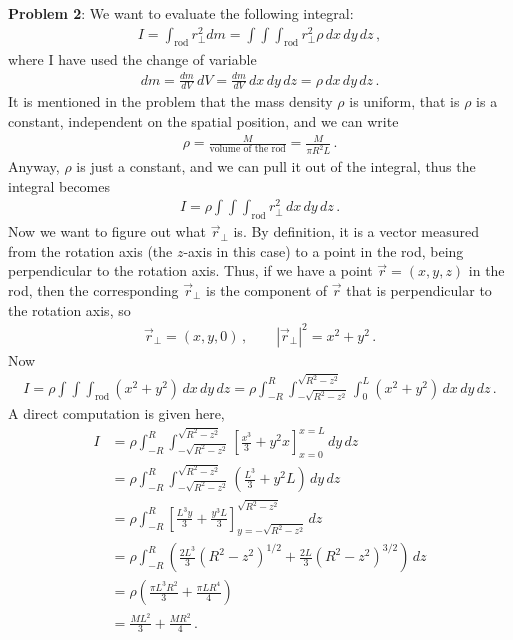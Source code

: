 \documentclass[11pt]{article}
\begin{document}
\textbf{Problem 2}: We want to evaluate the following integral:
\begin{align*}
I = \int_{\text{rod}} r_{\perp}^2 dm = 
\int\int\int_{\text{rod}} r_{\perp}^2 \rho \, dx\, dy\, dz\,,
\end{align*}
where I have used the change of variable
\begin{align*}
dm = \frac{dm}{dV} \, dV = \frac{dm}{dV} \, dx\, dy\, dz = \rho \, dx\, dy\, dz\,.
\end{align*}
It is mentioned in the problem that the mass density $\rho$ is uniform, that is $\rho$ is a constant, independent on the spatial position, and we can write
\begin{align*}
\rho = \frac{M}{\text{volume of the rod}}= \frac{M}{\pi R^2 L}\,.
\end{align*}
Anyway, $\rho$ is just a constant, and we can pull it out of the integral, thus the integral becomes
\begin{align*}
I = \rho \int \int \int_{\text{rod}} r_{\perp}^2 \, dx\, dy\, dz\,.
\end{align*}
Now we want to figure out what $\vec{r}_{\perp}$ is. By definition, it is a vector measured from the rotation axis (the $z$-axis in this case) to a point in the rod, being perpendicular to the rotation axis. Thus, if we have a point $\vec{r} = (x,y,z)$ in the rod, then the corresponding $\vec{r}_{\perp}$ is the component of $\vec{r}$ that is perpendicular to the rotation axis, so
\begin{align*}
\vec{r}_{\perp} = (x,y,0)\,,\qquad
|\vec{r}_{\perp}|^2 = x^2 + y^2\,.
\end{align*}
Now\begin{align*}
I = \rho \int \int \int_{\text{rod}} (x^2+y^2) \, dx\, dy\, dz
=\rho \int_{-R}^R\int_{-\sqrt{R^2 - z^2}}^{\sqrt{R^2 - z^2}}
 \int_{0}^L(x^2 + y^2)\, dx\, dy\,dz\,.
\end{align*}
A direct computation is given here,
\begin{align*}
I &= 
\rho \int_{-R}^R\int_{-\sqrt{R^2 - z^2}}^{\sqrt{R^2 - z^2}}
\left[ \frac{x^3}{3} + y^2 x\right]_{x=0}^{x=L}\, dy\, dz
\\
&=\rho \int_{-R}^R\int_{-\sqrt{R^2 - z^2}}^{\sqrt{R^2 - z^2}}
\left( \frac{L^3}{3} + y^2 L\right)
\, dy\,dz\\
&= \rho \int_{-R}^R 
\left[
\frac{L^3y}{3} + \frac{y^3L}{3}
\right]_{y=-\sqrt{R^2 - z^2}}^{\sqrt{R^2 - z^2}}\, dz\\
&=\rho \int_{-R}^R \left(\frac{2L^3}{3}\left( R^2 - z^2\right)^{1/2} + \frac{2L}{3}\left( R^2 - z^2\right)^{3/2}\right)\, dz\\
&= \rho \left(
\frac{\pi L^3 R^2}{3} + \frac{\pi L R^4}{4}
\right)\tag{*}\\
&=\frac{ML^2}{3} + \frac{MR^2}{4}\,.
\end{align*}
\end{document}

